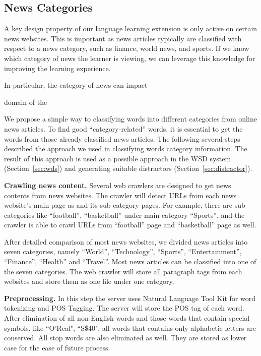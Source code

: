 \subsection{News Categories}
\label{subsec:category}

A key design property of our language learning extension is only
active on certain news websites.  This is important as news articles
typically are classified with respect to a news category, such as
finance, world news, and sports.  If we know which category of news
the learner is viewing, we can leverage this knowledge for improving
the learning experience.

In particular, the category of news can impact  

domain of the 

We propose a simple way to classifying words into different categories from online news articles. To find good “category-related” words, it is essential to get the words from those already classified news articles. The following several steps described the approach we used in classifying words category information. The result of this approach is used as a possible approach in the WSD system (Section~\ref{sec:wds}) and generating suitable distractors (Section~\ref{sec:distractor}). 

{\bf Crawling news content.}
Several web crawlers are designed to get news contents from news websites. The crawler will detect URLs from each news website’s main page as and its sub-category pages. For example, there are sub-categories like “football”, “basketball” under main category “Sports”, and the crawler is able to crawl URLs from “football” page and “basketball” page as well. 

After detailed comparison of most news websites, we divided news articles into seven categories, namely “World”, “Technology”, “Sports”, “Entertainment”, “Finance”, “Health” and “Travel”. Most news articles can be classified into one of the seven categories. The web crawler will store all paragraph tags from each websites and store them as one file under one category. 

{\bf Preprocessing.}
In this step the server uses Natural Language Tool Kit \cite{edw09} for word tokenizing and POS Tagging. The server will store the POS tag of each word. After elimination of all non-English words and those words that contain special symbols, like ``O’Real", ``S\$40", all words that contains only alphabetic letters are conserved. All stop words are also eliminated as well. They are stored as lower case for the ease of future process.

